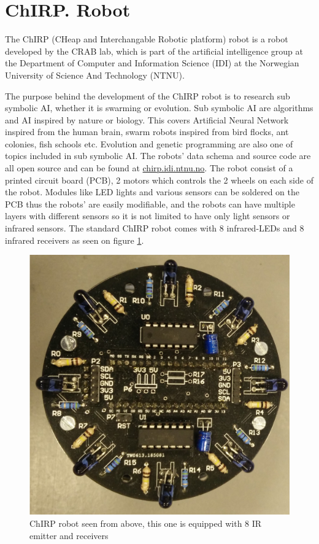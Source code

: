 \section{ChIRP. Robot}
\label{sec:chirp}
The ChIRP (CHeap and Interchangable Robotic platform) robot is a robot developed by the CRAB lab, which is part of the artificial intelligence group at the Department of Computer and Information Science (IDI) at the Norwegian University of Science And Technology (NTNU).

The purpose behind the development of the ChIRP robot is to research sub symbolic AI, whether it is swarming or evolution. Sub symbolic AI are algorithms and AI inspired by nature or biology. This covers Artificial Neural Network inspired from the human brain, swarm robots inspired from bird flocks, ant colonies, fish schools etc. Evolution and genetic programming are also one of topics included in sub symbolic AI.
The robots' data schema and source code are all open source and can be found at \href{http://chirp.idi.ntnu.no}{chirp.idi.ntnu.no}. The robot consist of a printed circuit board (PCB), 2 motors which controls the 2 wheels on each side of the robot.
Modules like LED lights and various sensors can be soldered on the PCB thus the robots' are easily modifiable, and the robots can have multiple layers with different sensors so it is not limited to have only light sensors or infrared sensors. The standard ChIRP robot comes with 8 infrared-LEDs and 8 infrared receivers as seen on figure \ref{fig:chirpAbove}.
\begin{figure}[H]
\centering
\includegraphics[width=0.8\linewidth]{images/chirpAbove.jpg}
\caption[ChIRP robot seen from above]{ChIRP robot seen from above, this one is equipped with 8 IR emitter and receivers}
\label{fig:chirpAbove}
\end{figure}
